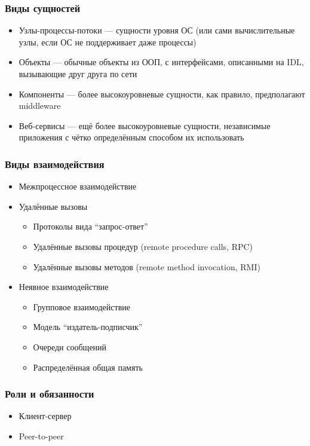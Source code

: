 \documentclass[xetex,mathserif,serif]{beamer}
\begin{document}
	\begin{frame}
		\frametitle{Виды сущностей}
		\begin{itemize}
			\item Узлы-процессы-потоки --- сущности уровня ОС (или сами вычислительные узлы, если ОС не поддерживает даже процессы)
			\item Объекты --- обычные объекты из ООП, с интерфейсами, описанными на IDL, вызывающие друг друга по сети
			\item Компоненты --- более высокоуровневые сущности, как правило, предполагают middleware
			\item Веб-сервисы --- ещё более высокоуровневые сущности, независимые приложения с чётко определённым способом их использовать
		\end{itemize}
	\end{frame}

	\begin{frame}
		\frametitle{Виды взаимодействия}
		\begin{itemize}
			\item Межпроцессное взаимодействие
			\item Удалённые вызовы
			\begin{itemize}
				\item Протоколы вида ``запрос-ответ''
				\item Удалённые вызовы процедур (remote procedure calls, RPC)
				\item Удалённые вызовы методов (remote method invocation, RMI)
			\end{itemize}
			\item Неявное взаимодействие
			\begin{itemize}
				\item Групповое взаимодействие
				\item Модель ``издатель-подписчик''
				\item Очереди сообщений
				\item Распределённая общая память
			\end{itemize}
		\end{itemize}
	\end{frame}

	\begin{frame}
		\frametitle{Роли и обязанности}
		\begin{itemize}
			\item Клиент-сервер
			\item Peer-to-peer
		\end{itemize}
	\end{frame}
\end{document}
